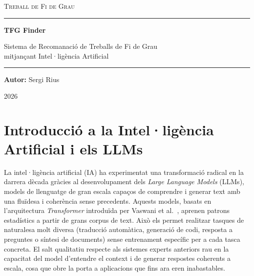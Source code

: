 \documentclass[12pt,a4paper]{article}
\begin{document}
\begin{titlepage}
    \centering
    \vspace*{2cm}
    {\scshape\Large Treball de Fi de Grau\par}
    \vspace{0.5cm}
    \rule{\linewidth}{0.4pt}
    \vspace{0.5cm}

    {\Huge\bfseries TFG Finder\par}
    \vspace{0.3cm}
    {\Large Sistema de Recomanació de Treballs de Fi de Grau\\[0.3em]
    mitjançant Intel·ligència Artificial\par}

    \vspace{0.5cm}
    \rule{\linewidth}{0.4pt}
    \vspace{1.5cm}

    {\large\textbf{Autor:} Sergi Rius\par}
    \vfill
    {\large 2026\par}
\end{titlepage}

\tableofcontents
\newpage

\section{Introducció a la Intel·ligència Artificial i els LLMs}

La intel·ligència artificial (IA) ha experimentat una transformació radical en la darrera dècada gràcies al desenvolupament dels \textit{Large Language Models} (LLMs), models de llenguatge de gran escala capaços de comprendre i generar text amb una fluïdesa i coherència sense precedents. Aquests models, basats en l'arquitectura \textit{Transformer} introduïda per Vaswani et al.\ \cite{vaswani2017attention}, aprenen patrons estadístics a partir de grans corpus de text. Això els permet realitzar tasques de naturalesa molt diversa (traducció automàtica, generació de codi, resposta a preguntes o síntesi de documents) sense entrenament específic per a cada tasca concreta. El salt qualitatiu respecte als sistemes experts anteriors rau en la capacitat del model d'entendre el context i de generar respostes coherents a escala, cosa que obre la porta a aplicacions que fins ara eren inabastables.
\end{document}
